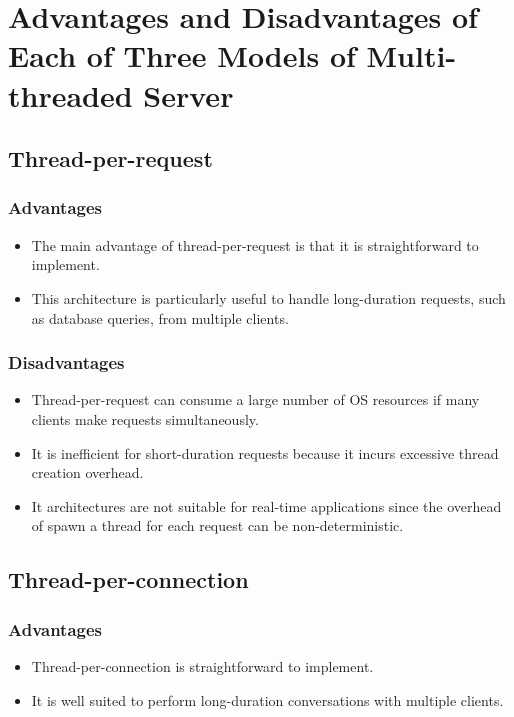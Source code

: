 \documentclass[11pt,a4paper]{report}
\begin{document}
	\section{Advantages and Disadvantages of Each of Three Models of Multi-threaded Server}
		\subsection{Thread-per-request}
			\subsubsection{Advantages}
			\begin{itemize}
				\item The main advantage of thread-per-request is that it is  straightforward to implement.
				\item This architecture is particularly useful to handle long-duration requests, such as database queries, from multiple clients.
			\end{itemize}
			\subsubsection{Disadvantages}
			\begin{itemize}
				\item Thread-per-request can consume a large number of OS resources if many clients make requests simultaneously.
				\item It is inefficient for short-duration requests because it incurs excessive thread creation overhead.  
				\item It architectures are not suitable for real-time applications since the overhead of spawn a thread for each request can be non-deterministic.
			\end{itemize}
		\subsection{Thread-per-connection}
			\subsubsection{Advantages}
			\begin{itemize}
				\item Thread-per-connection is straightforward to implement.
				\item It is well suited to perform long-duration conversations  with multiple clients.
			\end{itemize}
\end{document}
